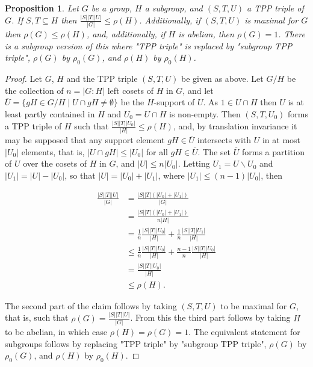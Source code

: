 \documentclass{amsart}
\theoremstyle{observation}
\newtheorem{proposition}[theorem]{Proposition}
\theoremstyle{definition}
\theoremstyle{remark}
\numberwithin{equation}{section}
\begin{document}
\begin{proposition}\label{PropTPPSplit} Let $G$ be a group, $H$ a subgroup, and $(S, T, U)$ a TPP triple of $G$. If $S, T \subseteq H$ then $\frac{|S||T||U|}{|G|} \leq \rho(H)$. Additionally, if $(S, T, U)$ is maximal for $G$ then $\rho(G) \leq \rho(H)$, and, additionally, if $H$ is abelian, then $\rho(G) = 1$. There is a subgroup version of this where "TPP triple" is replaced by "subgroup TPP triple", $\rho(G)$ by $\rho_0(G)$, and $\rho(H)$ by $\rho_0(H)$.
\end{proposition}
\begin{proof}Let $G$, $H$ and the TPP triple $(S, T, U)$ be given as above. Let $G/H$ be the collection of $n = |G:H|$ left cosets of $H$ in $G$, and let $\overline{U} = \{gH \in G/H \mathrel | U \cap gH \neq \emptyset\}$ be the $H$-support of $U$. As $1 \in U \cap H$ then $U$ is at least partly contained in $H$ and $U_0 = U \cap H$ is non-empty. Then $(S, T, U_0)$ forms a TPP triple of $H$ such that $\frac{|S||T||U_0|}{|H|} \leq \rho(H)$, and, by translation invariance \citep[Observation 2.1]{Neu2011} it may be supposed that any support element $gH \in \overline{U}$ intersects with $U$ in at most $|U_0|$ elements, that is, $|U \cap gH| \leq |U_0|$ for all $gH \in \overline{U}$. The set $\overline{U}$ forms a partition of $U$ over the cosets of $H$ in $G$, and $|U| \leq n|U_0|$. Letting $U_1 = U \backslash U_0$ and $|U_1| = |U| - |U_0|$, so that $|U| = |U_0| + |U_1|$, where $|U_1| \leq (n - 1)|U_0|$, then

\begin{align*}\frac{|S||T||U|}{|G|} &= \frac{|S||T|(|U_0| + |U_1|)}{|G|} \\
                                    &= \frac{|S||T|(|U_0| + |U_1|)}{n|H|} \\
                                    &= \frac{1}{n}\frac{|S||T||U_0|}{|H|} + \frac{1}{n}\frac{|S||T||U_1|}{|H|} \\
                                    &\leq \frac{1}{n}\frac{|S||T||U_0|}{|H|} + \frac{n - 1}{n}\frac{|S||T||U_0|}{|H|} \\
                                    &= \frac{|S||T||U_0|}{|H|} \\
                                    &\leq \rho(H).
\end{align*}

The second part of the claim follows by taking $(S, T, U)$ to be maximal for $G$, that is, such that $\rho(G) = \frac{|S||T||U|}{|G|}$. From this the third part follows by taking $H$ to be abelian, in which case $\rho(H) = \rho(G) = 1$. The equivalent statement for subgroups follows by replacing "TPP triple" by "subgroup TPP triple", $\rho(G)$ by $\rho_0(G)$, and $\rho(H)$ by $\rho_0(H)$.
\end{proof}
\end{document}
